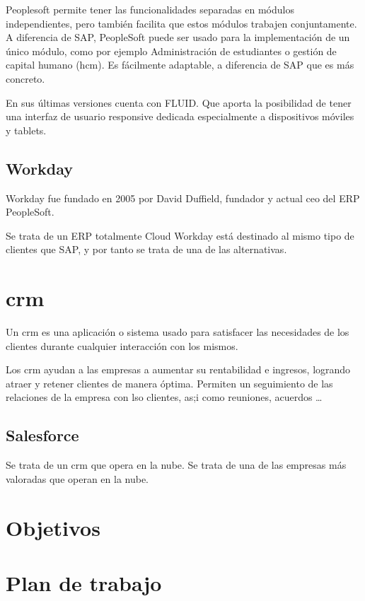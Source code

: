 Peoplesoft permite tener las funcionalidades separadas en módulos independientes, pero también facilita que estos módulos trabajen conjuntamente.
A diferencia de SAP, PeopleSoft puede ser usado para la implementación de un único módulo, como por ejemplo Administración de estudiantes o gestión de capital humano (hcm).
Es fácilmente adaptable, a diferencia de SAP que es más concreto.

En sus últimas versiones cuenta con FLUID. Que aporta la posibilidad de tener una interfaz de usuario responsive dedicada especialmente a dispositivos móviles y tablets.



\subsection{Workday}
Workday fue fundado en 2005 por David Duffield, fundador y actual \acrshort{ceo} del ERP PeopleSoft.

Se trata de un ERP totalmente Cloud
Workday está destinado al mismo tipo de clientes que SAP, y por tanto se trata de una de las alternativas.


\section{\acrfull{crm}}

Un \acrshort{crm} es una aplicación o sistema usado para satisfacer las necesidades de los clientes durante cualquier interacción con los mismos.

Los \acrshort{crm} ayudan a las empresas a aumentar su rentabilidad e ingresos, logrando atraer y retener clientes de manera óptima. 
Permiten un seguimiento de las relaciones de la empresa con lso clientes, as;i como reuniones, acuerdos \ldots


\subsection{Salesforce}
Se trata de un \acrshort{crm} que opera en la nube. Se trata de una de las empresas más valoradas que operan en la nube.





\section{Objetivos}


\section{Plan de trabajo}

